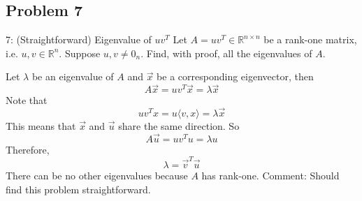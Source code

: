 \documentclass[../main]{subfiles}
\begin{document}
\subsection{Problem 7}
\begin{bbox}{7: (Straightforward) Eigenvalue of $uv^T$}
    Let $A = uv^T \in \mathbb R^{n\times n}$ be a rank-one matrix, i.e. $u, v \in \mathbb R^n$. Suppose $u,v \neq 0_n$. Find, with proof, all the eigenvalues of $A$.
\end{bbox}
\begin{solution}
    Let $\lambda$ be an eigenvalue of $A$ and $\vec x$ be a corresponding eigenvector, then 
    \[
    A \vec x= uv^T \vec x = \lambda \vec x 
    \]
    Note that 
    \[ 
    u v^T x = u \langle v, x\rangle = \lambda \vec x
    \]
    This means that $\vec x$ and $\vec u$ share the same direction. So 
    \[
    A \vec u = u v^T u = \lambda u
    \]
    Therefore, 
    \[
    \lambda = \vec v^T \vec u
    \]
    There can be no other eigenvalues because $A$ has rank-one.
    \newline
    Comment: Should find this problem straightforward.
\end{solution}
\end{document}

